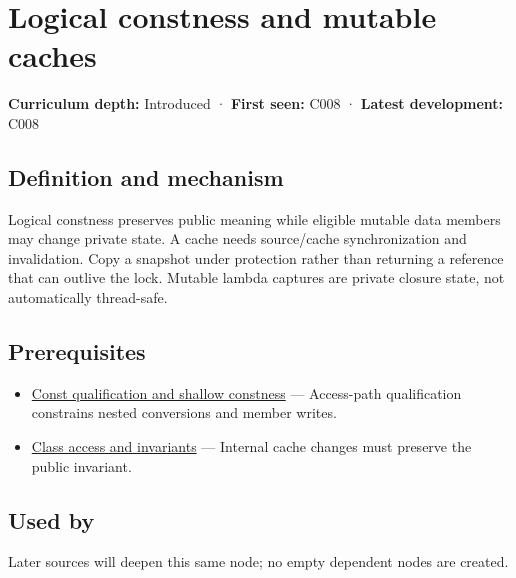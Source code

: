 \hypertarget{appendix-f5593256bcaf}{}\label{referencestart:appendix-f5593256bcaf}
\section{Logical constness and mutable caches}\label{appendix-f5593256bcaf-logical-constness-and-mutable-caches}

\textbf{Curriculum depth:} Introduced · \textbf{First seen:} C008 · \textbf{Latest development:} C008

\begin{allmightroledefinition}

\subsection{Definition and mechanism}\label{appendix-f5593256bcaf-definition-and-mechanism}

Logical constness preserves public meaning while eligible mutable data members may change private state. A cache needs source/cache synchronization and invalidation. Copy a snapshot under protection rather than returning a reference that can outlive the lock. Mutable lambda captures are private closure state, not automatically thread-safe.

\end{allmightroledefinition}

\subsection{Prerequisites}\label{appendix-f5593256bcaf-prerequisites}

\begin{itemize}
\tightlist
\item
  \hyperref[appendix-c25d60fed375]{Const qualification and shallow constness} --- Access-path qualification constrains nested conversions and member writes.
\item
  \hyperref[appendix-8e5214819615]{Class access and invariants} --- Internal cache changes must preserve the public invariant.
\end{itemize}

\subsection{Used by}\label{appendix-f5593256bcaf-used-by}

Later sources will deepen this same node; no empty dependent nodes are created.

